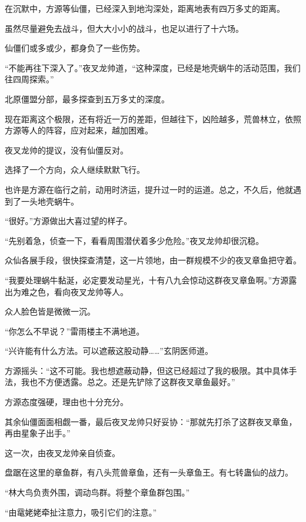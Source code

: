 
\begin{this_body}

在沉默中，方源等仙僵，已经深入到地沟深处，距离地表有四万多丈的距离。

虽然尽量避免去战斗，但大大小小的战斗，也足以进行了十六场。

仙僵们或多或少，都身负了一些伤势。

“不能再往下深入了。”夜叉龙帅道，“这种深度，已经是地壳蜗牛的活动范围，我们往四周探索。”

北原僵盟分部，最多探查到五万多丈的深度。

现在距离这个极限，还有将近一万的差距，但越往下，凶险越多，荒兽林立，依照方源等人的阵容，应对起来，越加困难。

夜叉龙帅的提议，没有仙僵反对。

选择了一个方向，众人继续默默飞行。

也许是方源在临行之前，动用时济运，提升过一时的运道。总之，不久后，他就遇到了一头地壳蜗牛。

“很好。”方源做出大喜过望的样子。

“先别着急，侦查一下，看看周围潜伏着多少危险。”夜叉龙帅却很沉稳。

众仙各展手段，很快探查清楚，这一片领地，由一群规模不少的夜叉章鱼把守着。

“我要处理蜗牛黏涎，必定要发动星光，十有八九会惊动这群夜叉章鱼啊。”方源露出为难之色，看向夜叉龙帅等人。

众人脸色皆是微微一沉。

“你怎么不早说？”雷雨楼主不满地道。

“兴许能有什么方法。可以遮蔽这股动静……”玄阴医师道。

方源摇头：“这不可能。我也想遮蔽动静，但这已经超过了我的极限。其中具体手法，我也不方便透露。总之。还是先铲除了这群夜叉章鱼最好。”

方源态度强硬，理由也十分充分。

其余仙僵面面相觑一番，最后夜叉龙帅只好妥协：“那就先打杀了这群夜叉章鱼，再由星象子出手。”

这一次，由夜叉龙帅亲自侦查。

盘踞在这里的章鱼群，有八头荒兽章鱼，还有一头章鱼王。有七转蛊仙的战力。

“林大鸟负责外围，调动鸟群。将整个章鱼群包围。”

“由鼋姥姥牵扯注意力，吸引它们的注意。”


\end{this_body}
